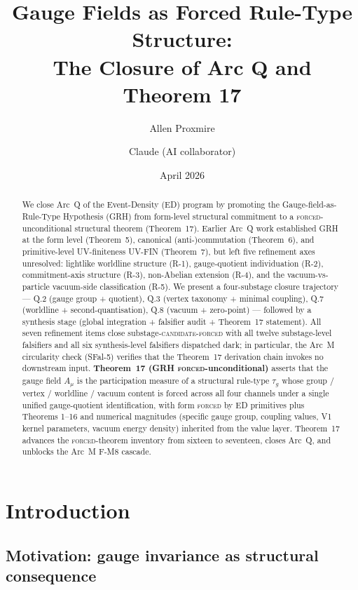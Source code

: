 \documentclass[11pt,a4paper]{article}
\title{Gauge Fields as Forced Rule-Type Structure:\\ The Closure of Arc Q and Theorem 17}
\author{Allen Proxmire \and Claude (AI collaborator)}
\date{April 2026}
\begin{document}
\maketitle

\begin{abstract}
We close Arc~Q of the Event-Density (ED) program by promoting the Gauge-field-as-Rule-Type Hypothesis (GRH) from form-level structural commitment to a \textsc{forced}-unconditional structural theorem (Theorem~17). Earlier Arc~Q work established GRH at the form level (Theorem~5), canonical (anti-)commutation (Theorem~6), and primitive-level UV-finiteness UV-FIN (Theorem~7), but left five refinement axes unresolved: lightlike worldline structure (R-1), gauge-quotient individuation (R-2), commitment-axis structure (R-3), non-Abelian extension (R-4), and the vacuum-vs-particle vacuum-side classification (R-5). We present a four-substage closure trajectory --- Q.2 (gauge group + quotient), Q.3 (vertex taxonomy + minimal coupling), Q.7 (worldline + second-quantisation), Q.8 (vacuum + zero-point) --- followed by a synthesis stage (global integration + falsifier audit + Theorem~17 statement). All seven refinement items close substage-\textsc{candidate-forced} with all twelve substage-level falsifiers and all six synthesis-level falsifiers dispatched dark; in particular, the Arc~M circularity check (SFal-5) verifies that the Theorem~17 derivation chain invokes no downstream input. \textbf{Theorem~17 (GRH \textsc{forced}-unconditional)} asserts that the gauge field $A_\mu$ is the participation measure of a structural rule-type $\tau_g$ whose group / vertex / worldline / vacuum content is forced across all four channels under a single unified gauge-quotient identification, with form \textsc{forced} by ED primitives plus Theorems 1--16 and numerical magnitudes (specific gauge group, coupling values, V1 kernel parameters, vacuum energy density) inherited from the value layer. Theorem~17 advances the \textsc{forced}-theorem inventory from sixteen to seventeen, closes Arc~Q, and unblocks the Arc~M F-M8 cascade.
\end{abstract}

\section{Introduction}

\subsection{Motivation: gauge invariance as structural consequence}
\end{document}
